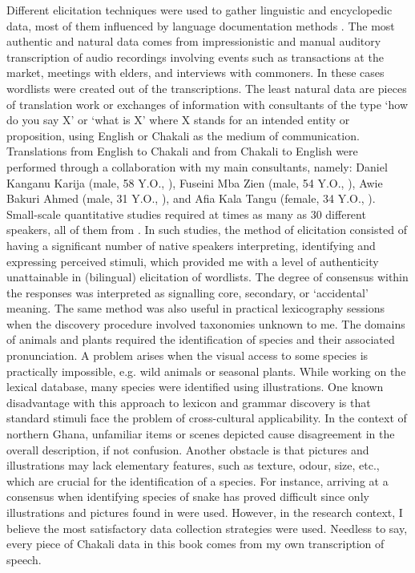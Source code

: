 
Different elicitation techniques were used to gather linguistic and encyclopedic data, most of them influenced by language documentation methods \citep[see][]{Lukp09}. The most authentic and natural data comes from impressionistic and manual auditory transcription of audio recordings involving events such as transactions at the market, meetings with elders,  and interviews with commoners. In these cases wordlists were created out of the transcriptions. The least natural data are pieces of translation work  or exchanges of information with consultants of the type `how do you say X' or  `what is X' where X stands for an intended entity or proposition, using English or Chakali as the medium of communication. Translations from English to Chakali and from Chakali to English  were performed through a  collaboration with my main consultants, namely: Daniel Kanganu Karija (male, 58 Y.O., ), Fuseini Mba Zien (male, 54 Y.O., ), Awie Bakuri Ahmed (male, 31 Y.O., ), and Afia Kala Tangu (female, 34 Y.O., ). Small-scale quantitative studies required at times as many as 30 different speakers, all of them from . In such studies, the method of elicitation consisted of having a significant number of native speakers interpreting, identifying and expressing perceived stimuli, which provided me with a level of authenticity unattainable in (bilingual) elicitation of wordlists.  The degree of consensus within the responses was interpreted as signalling core, secondary, or `accidental' meaning. The same method was also useful in practical lexicography sessions when the discovery procedure involved  taxonomies unknown to me. The domains of animals and plants required the identification of species and their associated pronunciation. A problem arises when the visual access to some species  is practically impossible, e.g.   wild animals or seasonal plants. While working on  the lexical database, many species were identified using illustrations. One known disadvantage with this approach to lexicon and grammar discovery is that standard stimuli  face the problem  of cross-cultural applicability.  In the context of  northern Ghana, unfamiliar items or scenes depicted cause disagreement in the overall description, if not confusion.  Another obstacle is that pictures and illustrations may lack elementary features, such as texture, odour, size, etc., which are crucial for the identification of a species.  For instance, arriving at a consensus when identifying  species of snake has proved difficult since  only  illustrations and pictures found in \citet{Cans61, Trap06} were used. However, in the research context,  I believe the most satisfactory data collection strategies were used. Needless to say, every piece of Chakali data in this book comes from my own transcription of speech.

